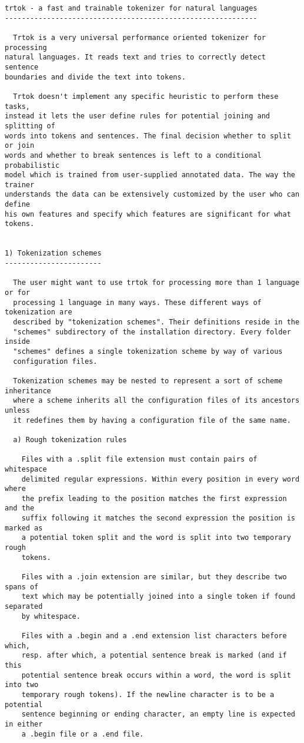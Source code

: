 \begin{small}
\begin{verbatim}
trtok - a fast and trainable tokenizer for natural languages
------------------------------------------------------------

  Trtok is a very universal performance oriented tokenizer for processing
natural languages. It reads text and tries to correctly detect sentence
boundaries and divide the text into tokens.

  Trtok doesn't implement any specific heuristic to perform these tasks,
instead it lets the user define rules for potential joining and splitting of
words into tokens and sentences. The final decision whether to split or join
words and whether to break sentences is left to a conditional probabilistic
model which is trained from user-supplied annotated data. The way the trainer
understands the data can be extensively customized by the user who can define
his own features and specify which features are significant for what tokens.


1) Tokenization schemes
-----------------------

  The user might want to use trtok for processing more than 1 language or for
  processing 1 language in many ways. These different ways of tokenization are
  described by "tokenization schemes". Their definitions reside in the
  "schemes" subdirectory of the installation directory. Every folder inside
  "schemes" defines a single tokenization scheme by way of various
  configuration files.

  Tokenization schemes may be nested to represent a sort of scheme inheritance
  where a scheme inherits all the configuration files of its ancestors unless
  it redefines them by having a configuration file of the same name.

  a) Rough tokenization rules

    Files with a .split file extension must contain pairs of whitespace
    delimited regular expressions. Within every position in every word where
    the prefix leading to the position matches the first expression and the
    suffix following it matches the second expression the position is marked as
    a potential token split and the word is split into two temporary rough
    tokens. 

    Files with a .join extension are similar, but they describe two spans of
    text which may be potentially joined into a single token if found separated
    by whitespace.

    Files with a .begin and a .end extension list characters before which,
    resp. after which, a potential sentence break is marked (and if this
    potential sentence break occurs within a word, the word is split into two
    temporary rough tokens). If the newline character is to be a potential
    sentence beginning or ending character, an empty line is expected in either
    a .begin file or a .end file.


\end{verbatim}
\end{small}
